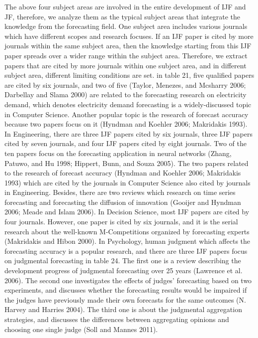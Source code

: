 \documentclass[11pt,a4paper]{elsarticle} %
\begin{document}
The above four subject areas are involved in the entire development of
IJF and JF, therefore, we analyze them as the typical subject areas that
integrate the knowledge from the forecasting field. One subject area
includes various journals which have different scopes and research
focuses. If an IJF paper is cited by more journals within the same
subject area, then the knowledge starting from this IJF paper spreads
over a wider range within the subject area. Therefore, we extract papers
that are cited by more journals within one subject area, and in
different subject area, different limiting conditions are set. in table
21, five qualified papers are cited by six journals, and two of five
(Taylor, Menezes, and Mcsharry 2006; Darbellay and Slama 2000) are
related to the forecasting research on electricity demand, which denotes
electricity demand forecasting is a widely-discussed topic in Computer
Science. Another popular topic is the research of forecast accuracy
because two papers focus on it (Hyndman and Koehler 2006; Makridakis
1993). In Engineering, there are three IJF papers cited by six journals,
three IJF papers cited by seven journals, and four IJF papers cited by
eight journals. Two of the ten papers focus on the forecasting
application in neural networks (Zhang, Patuwo, and Hu 1998; Hippert,
Bunn, and Souza 2005). The two papers related to the research of
forecast accuracy (Hyndman and Koehler 2006; Makridakis 1993) which are
cited by the journals in Computer Science also cited by journals in
Engineering. Besides, there are two reviews which research on time
series forecasting and forecasting the diffusion of innovation (Gooijer
and Hyndman 2006; Meade and Islam 2006). In Decision Science, most IJF
papers are cited by four journals. However, one paper is cited by six
journals, and it is the serial research about the well-known
M-Competitions organized by forecasting experts (Makridakis and Hibon
2000). In Psychology, human judgment which affects the forecasting
accuracy is a popular research, and there are three IJF papers focus on
judgmental forecasting in table 24. The first one is a review describing
the development progress of judgmental forecasting over 25 years
(Lawrence et al. 2006). The second one investigates the effects of
judges' forecasting based on two experiments, and discusses whether the
forecasting results would be impaired if the judges have previously made
their own forecasts for the same outcomes (N. Harvey and Harries 2004).
The third one is about the judgmental aggregation strategies, and
discusses the differences between aggregating opinions and choosing one
single judge (Soll and Mannes 2011).
\end{document}
